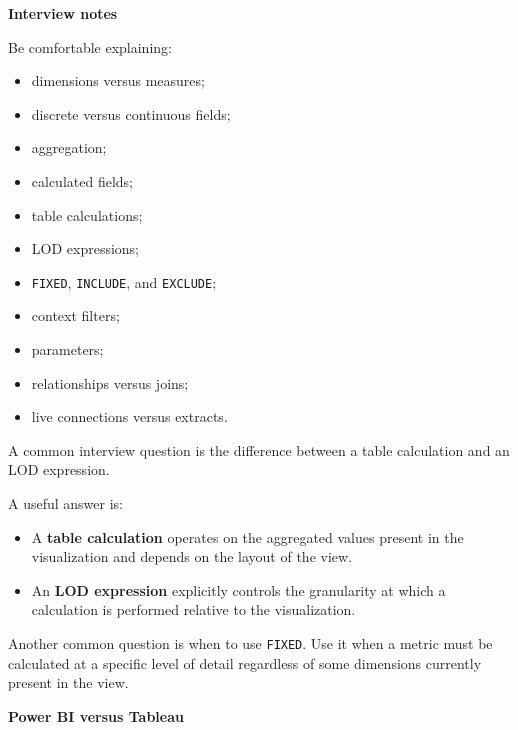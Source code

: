 \documentclass[11pt,letterpaper]{article}
\begin{document}

\textbf{Interview notes}

Be comfortable explaining:

\begin{itemize}[leftmargin=*]
    \item dimensions versus measures;
    \item discrete versus continuous fields;
    \item aggregation;
    \item calculated fields;
    \item table calculations;
    \item LOD expressions;
    \item \texttt{FIXED}, \texttt{INCLUDE}, and \texttt{EXCLUDE};
    \item context filters;
    \item parameters;
    \item relationships versus joins;
    \item live connections versus extracts.
\end{itemize}

A common interview question is the difference between a table calculation and
an LOD expression.

A useful answer is:

\begin{itemize}[leftmargin=*]
    \item A \textbf{table calculation} operates on the aggregated values present in
    the visualization and depends on the layout of the view.
    \item An \textbf{LOD expression} explicitly controls the granularity at which a
    calculation is performed relative to the visualization.
\end{itemize}

Another common question is when to use \texttt{FIXED}. Use it when a metric
must be calculated at a specific level of detail regardless of some dimensions
currently present in the view.



\textbf{Power BI versus Tableau}
\end{document}
